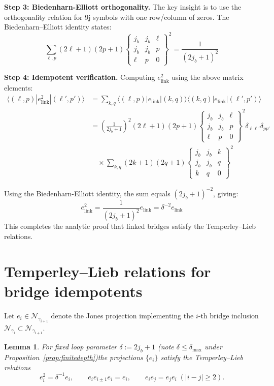 \documentclass[11pt]{article}
\newtheorem{lemma}{Lemma}[section]
\begin{document}
\textbf{Step 3: Biedenharn-Elliott orthogonality.}
The key insight is to use the orthogonality relation for 9j symbols with one 
row/column of zeros. The Biedenharn–Elliott identity \cite[Eq.\,(10.4.4)]{BiedenharnLouck} 
states:
\[
  \sum_{\ell,p} (2\ell+1)(2p+1) \begin{Bmatrix} j_b & j_b & \ell \\ j_b & j_b & p \\ \ell & p & 0 \end{Bmatrix}^2 = \frac{1}{(2j_b+1)^2}
\]

\textbf{Step 4: Idempotent verification.}
Computing $e_{\text{link}}^2$ using the above matrix elements:
\begin{align}
  \langle(\ell,p)|e_{\text{link}}^2|(\ell',p')\rangle 
  &= \sum_{k,q} \langle(\ell,p)|e_{\text{link}}|(k,q)\rangle \langle(k,q)|e_{\text{link}}|(\ell',p')\rangle \\
  &= \left(\frac{1}{2j_b+1}\right)^2 (2\ell+1)(2p+1) \begin{Bmatrix} j_b & j_b & \ell \\ j_b & j_b & p \\ \ell & p & 0 \end{Bmatrix}^2 \delta_{\ell\ell'}\delta_{pp'} \\
  &\quad \times \sum_{k,q} (2k+1)(2q+1) \begin{Bmatrix} j_b & j_b & k \\ j_b & j_b & q \\ k & q & 0 \end{Bmatrix}^2
\end{align}

Using the Biedenharn-Elliott identity, the sum equals $(2j_b+1)^{-2}$, giving:
\[
  e_{\text{link}}^2 = \frac{1}{(2j_b+1)^2} e_{\text{link}} = \delta^{-2} e_{\text{link}}
\]
This completes the analytic proof that linked bridges satisfy the
Temperley–Lieb relations.


\appendix
\section{Temperley--Lieb relations for bridge idempotents}\label{app:TL}

Let $e_i\in\mathcal N_{\gamma_{i+1}}$ denote the Jones projection 
implementing the $i$-th bridge inclusion 
$\mathcal N_{\gamma_i}\subset\mathcal N_{\gamma_{i+1}}$.

\begin{lemma}
For fixed loop parameter $\delta := 2j_b+1$ (note $\delta\le\delta_{\max}$ under Proposition~\ref{prop:finitedepth})\;the projections $\{e_i\}$
satisfy the Temperley--Lieb relations
\[
  e_i^2 = \delta^{-1} e_i,\qquad
  e_i e_{i\pm1} e_i = e_i,\qquad
  e_i e_j = e_j e_i\;( |i-j|\ge 2).
\]
\end{lemma}
\end{document}
